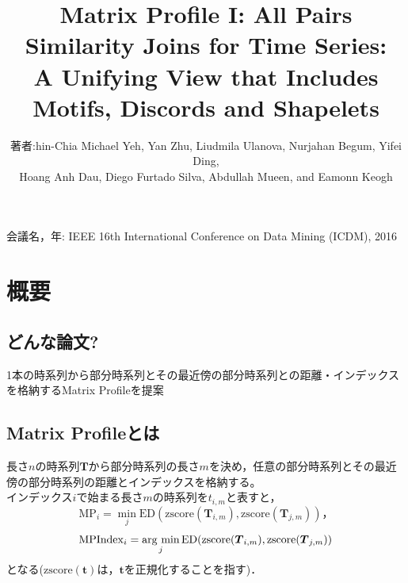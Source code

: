 \documentclass{jsarticle}
\newcommand{\argmin}{\mathop{\rm arg~min}\limits}
\begin{document}
\title{Matrix Profile I: All Pairs Similarity Joins for Time Series:\\
	A Unifying View that Includes Motifs, Discords and Shapelets}
\author{著者:hin-Chia Michael Yeh, Yan Zhu, Liudmila Ulanova, Nurjahan Begum, Yifei Ding,\\
	Hoang Anh Dau, Diego Furtado Silva, Abdullah Mueen, and Eamonn Keogh}
\date{}
\maketitle
会議名，年: IEEE 16th International Conference on Data Mining (ICDM), 2016
\section{概要}
\subsection{どんな論文?}
1本の時系列から部分時系列とその最近傍の部分時系列との距離・インデックスを格納するMatrix Profileを提案

\subsection{Matrix Profileとは}
長さ$n$の時系列$\boldsymbol{T}$から部分時系列の長さ$m$を決め，任意の部分時系列とその最近傍の部分時系列の距離とインデックスを格納する。\\
インデックス$i$で始まる長さ$m$の時系列を$t_{i,m}$と表すと，
\begin{displaymath}
\mathrm{MP}_i = \min_j{\mathrm{ED}(\mathrm{zscore}(\boldsymbol{T}_{i,m}),\mathrm{zscore}(\boldsymbol{T}_{j,m}))}，
\end{displaymath}
\begin{displaymath}
\mathrm{MPIndex}_i = \argmin_j{\mathrm{ED}(\mathrm{zscore}(\boldsymbol{T}_{i,m}),\mathrm{zscore}(\boldsymbol{T}_{j,m}))}
\end{displaymath}
となる($\mathrm{zscore}(\boldsymbol{t})$は，$\boldsymbol{t}$を正規化することを指す)．
\end{document}
